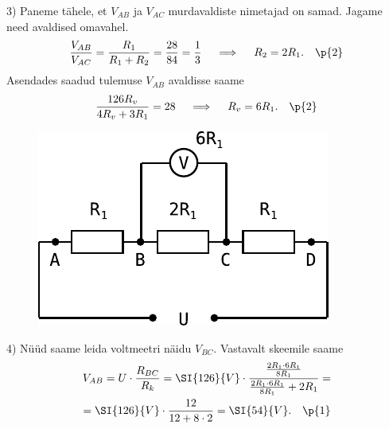 3) Paneme tähele, et $V_{AB}$ ja $V_{AC}$ murdavaldiste nimetajad on samad. Jagame need avaldised omavahel.
\[
\frac{V_{AB}}{V_{AC}}=\frac{R_1}{R_1+R_2}=\frac{28}{84}=\frac{1}{3} \quad\implies\quad R_2=2R_1. \quad \p{2}
\]
Asendades saadud tulemuse $V_{AB}$ avaldisse saame
\[
\frac{126 R_v}{4R_v+3R_1}=28\quad\implies\quad R_v=6R_1. \quad \p{2}
\]

\begin{figure}
\vspace{-2em}
  \begin{center}
    \includegraphics[width=1\linewidth]{2023-v2g-07-yl3.pdf}
  \end{center}
\vspace{-5em}
\end{figure}

4) Nüüd saame leida voltmeetri näidu $V_{BC}$. Vastavalt skeemile saame
\begin{multline*}
V_{AB}=U\cdot\frac{R_{BC}}{R_k}=\SI{126}{V}\cdot\frac{\frac{2R_1\cdot6R_1}{8R_1}}{\frac{2R_1\cdot6R_1}{8R_1}+2R_1}=\\
=\SI{126}{V}\cdot\frac{12}{12+8\cdot2}=\SI{54}{V}. \quad \p{1}
\end{multline*}
\probend